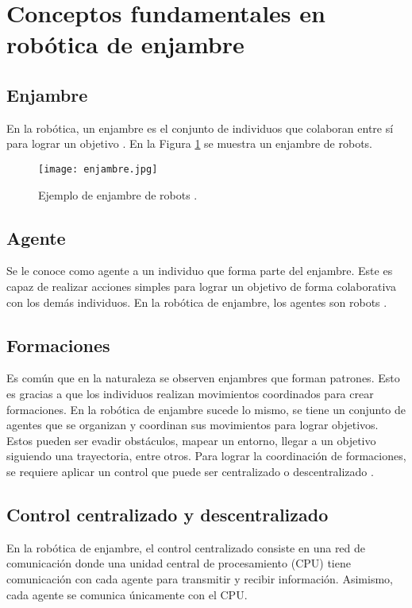 \section{Conceptos fundamentales en robótica de enjambre}

\subsection{Enjambre}
En la robótica, un enjambre es el conjunto de individuos que colaboran entre sí para lograr un objetivo \cite{robotica_enjambre3}. En la Figura \ref{fig:enjambre} se muestra un enjambre de robots.

\begin{figure}[H]
	\centering
	\texttt{[image: enjambre.jpg]}
	\caption{Ejemplo de enjambre de robots \cite{imgEnjambre}.}
	\label{fig:enjambre}
\end{figure}

\subsection{Agente}
Se le conoce como agente a un individuo que forma parte del enjambre. Este es capaz de realizar acciones simples para lograr un objetivo de forma colaborativa con los demás individuos. En la robótica de enjambre, los agentes son robots \cite{definiciones_robotica_enjambre}.

\subsection{Formaciones}
Es común que en la naturaleza se observen enjambres que forman patrones. Esto es gracias a que los individuos realizan movimientos coordinados para crear formaciones. En la robótica de enjambre sucede lo mismo, se tiene un conjunto de agentes que se organizan y coordinan sus movimientos para lograr objetivos. Estos pueden ser evadir obstáculos, mapear un entorno, llegar a un objetivo siguiendo una trayectoria, entre otros. Para lograr la coordinación de formaciones, se requiere aplicar un control que puede ser centralizado o descentralizado \cite{definiciones_robotica_enjambre}.

\subsection{Control centralizado y descentralizado}
En la robótica de enjambre, el control centralizado consiste en una red de comunicación donde una unidad central de procesamiento (CPU) tiene comunicación con cada agente para transmitir y recibir información. Asimismo, cada agente se comunica únicamente con el CPU.

